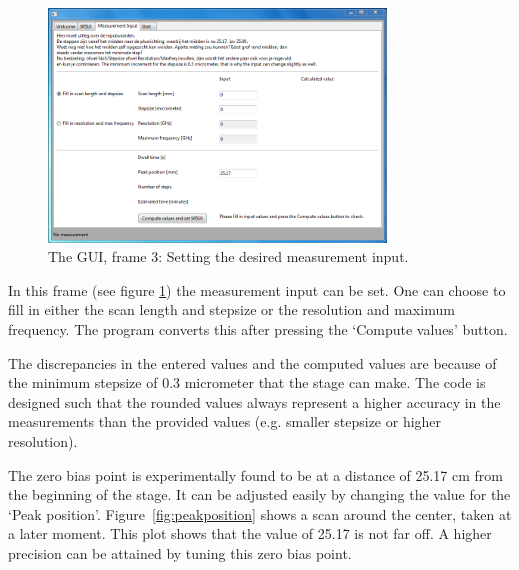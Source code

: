 \begin{figure}[!ht]
 \begin{center}
  \includegraphics[width=0.8\textwidth]{figures/gui3}
  \caption{The GUI, frame 3: Setting the desired measurement input.}
  \label{fig:gui3}
 \end{center}
\end{figure}

In this frame (see figure \ref{fig:gui3}) the measurement input can be set. One can choose to fill in either the scan length and stepsize or the resolution and maximum frequency. The program converts this after pressing the `Compute values' button.

The discrepancies in the entered values and the computed values are because of the minimum stepsize of 0.3 micrometer that the stage can make. The code is designed such that the rounded values always represent a higher accuracy in the measurements than the provided values (e.g. smaller stepsize or higher resolution).

The zero bias point is experimentally found to be at a distance of 25.17 cm from the beginning of the stage. It can be adjusted easily by changing the value for the `Peak position'. Figure~\ref{fig:peakposition} shows a scan around the center, taken at a later moment. This plot shows that the value of 25.17 is not far off. A higher precision can be attained by tuning this zero bias point.

